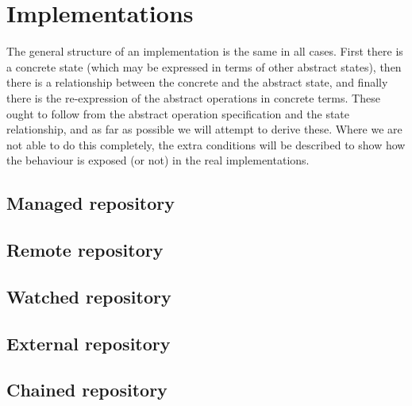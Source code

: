 \documentclass[a4paper,titlepage,twoside,12pt]{article}
\begin{document}
\section{Implementations}
The general structure of an implementation is the same in all cases. First there is a concrete state (which may be expressed in terms of other abstract states), then there is a relationship between the concrete and the abstract state, and finally there is the re-expression of the abstract operations in concrete terms. These ought to follow from the abstract operation specification and the state relationship, and as  far as possible we will attempt to derive these. Where we are not able to do this completely, the extra conditions will be described to show how the behaviour is exposed (or not) in the real implementations.

\subsection{Managed repository}

\subsection{Remote repository}

\subsection{Watched repository}

\subsection{External repository}

\subsection{Chained repository}
\end{document}
